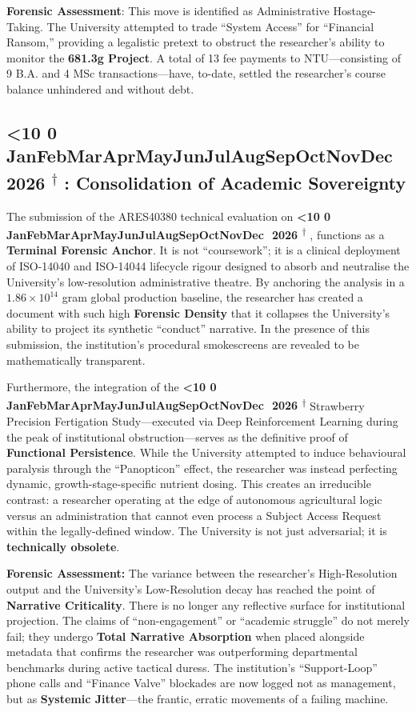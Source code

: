 \documentclass{EMBASSY}
\DeclareRobustCommand{\gmt}[3]{%
    \texorpdfstring{%
        {\color{DateGold}\textbf{%
            \ifnum#1<10 0\fi#1\,\textperiodcentered\,%
            \ifcase#2\or Jan\or Feb\or Mar\or Apr\or May\or Jun\or Jul\or Aug\or Sep\or Oct\or Nov\or Dec\fi
            \,\textperiodcentered\,20#3%
            \textsuperscript{$\dagger$}%
        }}%
    }{%
        (#1/#2/#3)%
    }%
}
\begin{document}
\textbf{Forensic Assessment}: This move is identified as Administrative Hostage-Taking. The University attempted to trade ``System Access'' for ``Financial Ransom,'' providing a legalistic pretext to obstruct the researcher’s ability to monitor the \textbf{681.3g Project}. A total of 13 fee payments to NTU---consisting of 9 B.A. and 4 MSc transactions---have, to-date, settled the researcher's course balance unhindered and without debt.

\subsection{\gmt{22}{2}{26}: Consolidation of Academic Sovereignty}
The submission of the ARES40380 technical evaluation on \gmt{22}{2}{26}, functions as a \textbf{Terminal Forensic Anchor}. It is not ``coursework''; it is a clinical deployment of ISO-14040 \cite{ISO14040} and ISO-14044 \cite{ISO14044} lifecycle rigour designed to absorb and neutralise the University’s low-resolution administrative theatre. By anchoring the analysis in a $1.86×10^{14}$ gram global production baseline, the researcher has created a document with such high \textbf{Forensic Density} that it collapses the University’s ability to project its synthetic ``conduct'' narrative. In the presence of this submission, the institution’s procedural smokescreens are revealed to be mathematically transparent.

Furthermore, the integration of the \gmt{20}{1}{26} Strawberry Precision Fertigation Study---executed via Deep Reinforcement Learning during the peak of institutional obstruction---serves as the definitive proof of \textbf{Functional Persistence}. While the University attempted to induce behavioural paralysis through the ``Panopticon'' effect, the researcher was instead perfecting dynamic, growth-stage-specific nutrient dosing. This creates an irreducible contrast: a researcher operating at the edge of autonomous agricultural logic versus an administration that cannot even process a Subject Access Request within the legally-defined window. The University is not just adversarial; it is \textbf{technically obsolete}.

\textbf{Forensic Assessment:} The variance between the researcher's High-Resolution output and the University's Low-Resolution decay has reached the point of \textbf{Narrative Criticality}. There is no longer any reflective surface for institutional projection. The claims of ``non-engagement'' or ``academic struggle'' do not merely fail; they undergo \textbf{Total Narrative Absorption} when placed alongside metadata that confirms the researcher was outperforming departmental benchmarks during active tactical duress. The institution’s ``Support-Loop'' phone calls and ``Finance Valve'' blockades are now logged not as management, but as \textbf{Systemic Jitter}---the frantic, erratic movements of a failing machine.
\end{document}
